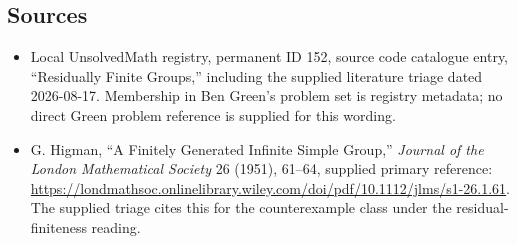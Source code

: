 \documentclass[11pt]{article}
\begin{document}
\subsection{Sources}
\begin{itemize}
\item Local UnsolvedMath registry, permanent ID 152, source code catalogue entry, ``Residually Finite Groups,'' including the supplied literature triage dated 2026-08-17. Membership in Ben Green's problem set is registry metadata; no direct Green problem reference is supplied for this wording.
\item G. Higman, ``A Finitely Generated Infinite Simple Group,'' \emph{Journal of the London Mathematical Society} 26 (1951), 61--64, supplied primary reference: \url{https://londmathsoc.onlinelibrary.wiley.com/doi/pdf/10.1112/jlms/s1-26.1.61}. The supplied triage cites this for the counterexample class under the residual-finiteness reading.
\end{itemize}
\end{document}
